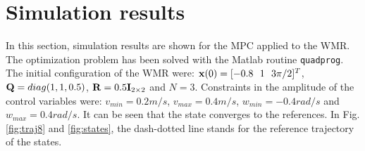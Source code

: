 \documentclass[conference]{IEEEtran} %
\begin{document}
\section{Simulation results}
\label{sec:simulations}

In this section, simulation results are shown for the MPC applied to the WMR. The optimization problem has been solved with the {\sc Matlab} routine {\tt quadprog}. The initial configuration of the WMR were: ${\bf x}(0)=[-0.8~~1~~3\pi/2]^T$, ${\bf Q}=diag(1,1,0.5)$, ${\bf R}=0.5{\bf I}_{2\times 2}$ and $N=3$. Constraints in
the amplitude of the control variables were: $v_{min}=0.2 m/s$, $v_{max}=0.4 m/s$, $w_{min}=-0.4 rad/s$ and $w_{max}=0.4 rad/s$. It can be seen that the state converges to the references. In Fig. \ref{fig:traj8} and \ref{fig:states}, the dash-dotted line stands for the reference trajectory of the states.
\end{document}

